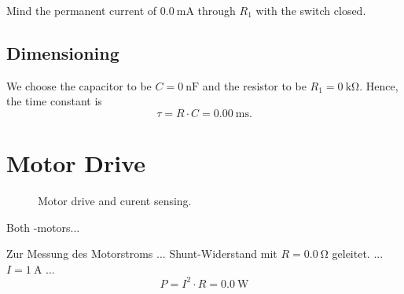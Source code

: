\documentclass[12pt,fleqn,parskip=half,twoside,toc=index,headings=small,a4paper]{scrreprt}
\begin{document}
	Mind the permanent current of $\SI{0.0}{\mA}$ through $R_{1}$ with the switch closed.
	\subsection*{Dimensioning}
	We choose the capacitor to be $C=\SI{0}{\nano\farad}$ and the resistor to be $R_1 = \SI{0}{\kilo\ohm}$.
	Hence, the time constant is
	\begin{equation}
		\tau = R \cdot C = \SI{0.00}{\ms}.
	\end{equation}
	\section{Motor Drive}
	\begin{figure}[h!]
		\centering
		\caption{Motor drive and curent sensing.}\label{Motor}
	\end{figure}
	Both -motors... 
	
	Zur Messung des Motorstroms ... Shunt-Widerstand mit $R=\SI{0.0}{\ohm}$ geleitet.
	... $I=\SI{1}{\A}$ ...
	\begin{equation}
		P=I^2\cdot R=\SI{0.0}{\W}
	\end{equation}
\end{document}
